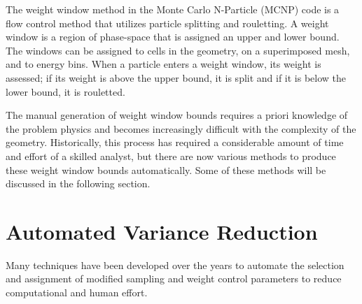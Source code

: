 The weight window method in the Monte Carlo N-Particle (MCNP) code is a flow
control method that utilizes particle
splitting and rouletting.  A weight window is a region of phase-space that is 
assigned an upper and lower bound.  The windows can be assigned to cells in the
geometry, on a superimposed mesh, and to energy bins.  When a particle enters
a weight window, its weight is assessed; if its weight is above the upper bound,
it is split and if it is below the lower bound, it is rouletted.  

The manual generation of weight window bounds requires a priori knowledge of the problem physics and becomes increasingly difficult with the complexity of the geometry. 
Historically, this process has required a considerable amount of time and
effort of a skilled analyst, but there are now various
methods to produce these weight window bounds automatically.
Some of these methods will be discussed in the following section.


\section{Automated Variance Reduction}\label{sec:auto_vr}

Many techniques have been developed over the years to automate the selection and
assignment of modified sampling and weight control parameters to reduce computational and human effort.

